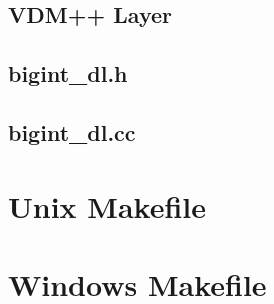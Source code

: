 \documentclass[\pformat,12pt]{article}
\begin{document}
\subsection{VDM++ Layer}



\subsection{bigint\_dl.h}



\subsection{bigint\_dl.cc}



\newpage
\section{Unix Makefile}\label{app:unixmake}


\newpage
\section{Windows Makefile}\label{app:winmake}

\end{document}

